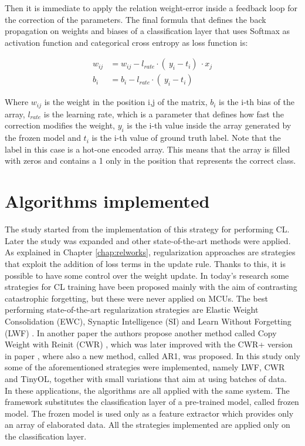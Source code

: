 \documentclass[12pt]{report}
\begin{document}
Then it is immediate to apply the relation weight-error inside a feedback loop for the correction of the parameters. The final formula that defines the back propagation on weights and biases of a classification layer that uses Softmax as activation function and categorical cross entropy as loss function is:

\begin{align}
	w_{ij} &= w_{ij} - l_{rate} \cdot (\ y_i-t_i )\ \cdot x_j \label{w_update} \\
	b_i    &= b_i    - l_{rate} \cdot (\ y_i-t_i )\ \label{b_update} 
\end{align}

Where $w_{ij}$ is the weight in the position i,j of the matrix, $b_i$ is the i-th bias of the array, $l_{rate}$ is the learning rate, which is a parameter that defines how fast the correction modifies the weight, $y_i$ is the i-th value inside the array generated by the frozen model and $t_i$ is the i-th value of ground truth label. Note that the label in this case is a hot-one encoded array. This means that the array is filled with zeros and contains a 1 only in the position that represents the correct class.

\section{Algorithms implemented}
The study started from the implementation of this strategy for performing CL. Later the study was expanded and other state-of-the-art methods were applied. As explained in Chapter \ref{chap:relworks}, regularization approaches are strategies that exploit the addition of loss terms in the update rule. Thanks to this, it is possible to have some control over the weight update. In today's research some strategies for CL training have been proposed mainly with the aim of contrasting catastrophic forgetting, but these were never applied on MCUs. The best performing state-of-the-art regularization strategies are Elastic Weight Consolidation (EWC), Synaptic Intelligence (SI) and Learn Without Forgetting (LWF) \autocite{li2017learning}. In another paper the authors propose another method called Copy Weight with Reinit (CWR) \autocite{lomonaco2017core50}, which was later improved with the CWR+ version in paper \autocite{maltoni2019continuous}, where also a new method, called AR1, was proposed. In this study only some of the aforementioned strategies were implemented, namely LWF, CWR and TinyOL, together with small variations that aim at using batches of data. \\
In these applications, the algorithms are all applied with the same system. The framework substitutes the classification layer of a pre-trained model, called frozen model. The frozen model is used only as a feature extractor which provides only an array of elaborated data. All the strategies implemented are applied only on the classification layer.
\end{document}
